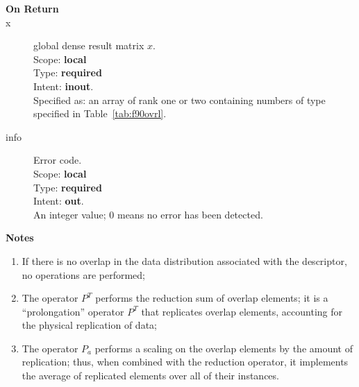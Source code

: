\begin{description}
\item[\bf On Return] 
\item[x] global dense result matrix $x$.\\
Scope: {\bf local} \\
Type: {\bf required} \\
Intent: {\bf inout}.\\
Specified as: an  array of rank one or two
containing numbers of type specified in
Table~\ref{tab:f90ovrl}.
\item[info] Error code.\\
Scope: {\bf local} \\
Type: {\bf required} \\
Intent: {\bf out}.\\
An integer value; 0 means no error has been detected. 
\end{description}


{\par\noindent\large\bfseries Notes}
\begin{enumerate}
\item If there is no overlap in the data distribution associated with
  the descriptor, no operations are performed;
\item The operator $P^{T}$ performs the reduction sum of overlap
elements; it is a ``prolongation'' operator $P^T$ that
replicates overlap elements, accounting for the physical replication
of data;
\item The operator $P_a$ performs a scaling on the overlap elements by
the amount of replication; thus, when combined with the reduction
operator, it implements the average of replicated elements over all of
their instances. 
\end{enumerate}
 
